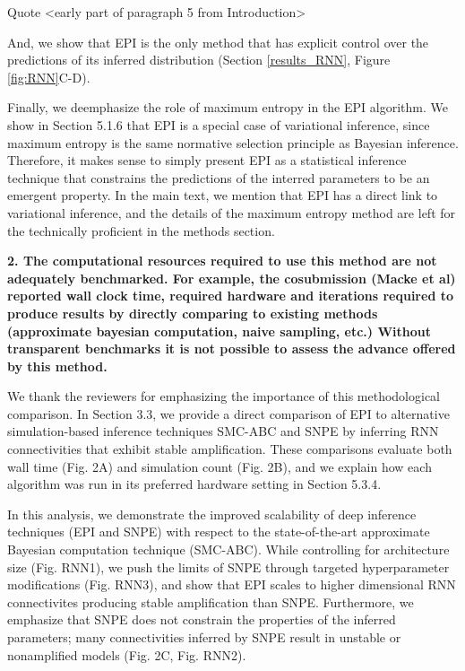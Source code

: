 \documentclass[11pt,a4paper]{article}
\begin{document}
Quote <early part of paragraph 5 from Introduction>

And, we show that EPI is the only method that has explicit control over the predictions of its inferred distribution (Section \ref{results_RNN}, Figure \ref{fig:RNN}C-D).

Finally, we deemphasize the role of maximum entropy in the EPI algorithm.  We show in Section 5.1.6 that EPI is a special case of variational inference, since maximum entropy is the same normative selection principle as Bayesian inference.  Therefore, it makes sense to simply present EPI as a statistical inference technique that constrains the predictions of the interred parameters to be an emergent property.  In the main text, we mention that EPI has a direct link to variational inference, and the details of the maximum entropy method are left for the technically proficient in the methods section. 

\textbf{2. The computational resources required to use this method are not adequately benchmarked. For example, the cosubmission (Macke et al) reported wall clock time, required hardware and iterations required to produce results by directly comparing to existing methods (approximate bayesian computation, naive sampling, etc.) Without transparent benchmarks it is not possible to assess the advance offered by this method.} 

We thank the reviewers for emphasizing the importance of this methodological comparison.  In Section 3.3, we provide a direct comparison of EPI to alternative simulation-based inference techniques SMC-ABC and SNPE by inferring RNN connectivities that exhibit stable amplification.  These comparisons evaluate both wall time (Fig. 2A) and simulation count (Fig. 2B), and we explain how each algorithm was run in its preferred hardware setting in Section 5.3.4.
 
In this analysis, we demonstrate the improved scalability of deep inference techniques (EPI and SNPE) with respect to the state-of-the-art approximate Bayesian computation technique (SMC-ABC).
While controlling for architecture size (Fig. RNN1), we push the limits of SNPE through targeted hyperparameter modifications (Fig. RNN3), and show that EPI scales to higher dimensional RNN connectivites producing stable amplification than SNPE.
Furthermore, we emphasize that SNPE does not constrain the properties of the inferred parameters; many connectivities inferred by SNPE result in unstable or nonamplified models (Fig. 2C, Fig. RNN2).
\end{document}
